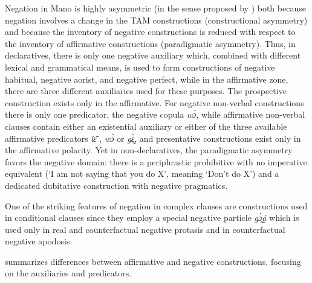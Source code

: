 \documentclass[output=paper,colorlinks,citecolor=brown]{langscibook}
\begin{document}
Negation in Mano is highly asymmetric (in the sense proposed by \citealt{Miestamo2005}) both because negation involves a change in the TAM constructions (constructional asymmetry) and because the inventory of negative constructions is reduced with respect to the inventory of affirmative constructions (paradigmatic asymmetry). Thus, in declaratives, there is only one negative auxiliary which, combined with different lexical and grammatical means, is used to form constructions of negative habitual, negative aorist, and negative perfect, while in the affirmative zone, there are three different auxiliaries used for these purposes. The prospective construction exists only in the affirmative. For negative non-verbal constructions there is only one predicator, the negative copula \textit{wɔ́}, while affirmative non-verbal clauses contain either an existential auxiliary or either of the three available affirmative predicators \textit{lɛ̄ }, \textit{wɔ́} or \textit{gɛ̰̀}, and presentative constructions exist only in the affirmative polarity. Yet in non-declaratives, the paradigmatic asymmetry favors the negative domain: there is a periphrastic prohibitive with no imperative equivalent (‘I am not saying that you do X’, meaning ‘Don’t do X’) and a dedicated dubitative construction with negative pragmatics.



One of the striking features of negation in complex clauses are constructions used in conditional clauses since they employ a special negative particle \textit{gɔ̰̀á̰̰} which is used only in real and counterfactual negative protasis and in counterfactual negative apodosis. 

 summarizes differences between affirmative and negative constructions, focusing on the auxiliaries and predicators.
\end{document}

